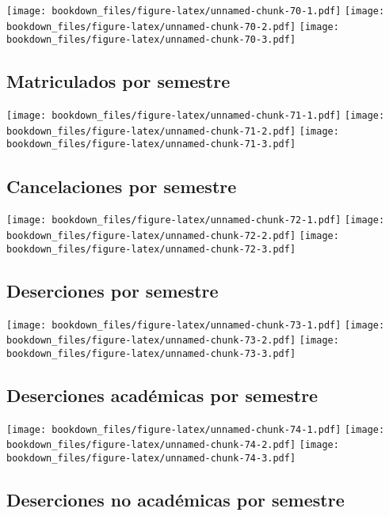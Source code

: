 \documentclass[]{article}
\theoremstyle{definition}
\theoremstyle{definition}
\theoremstyle{definition}
\theoremstyle{remark}
\begin{document}
\texttt{[image: bookdown\_files/figure-latex/unnamed-chunk-70-1.pdf]}
\texttt{[image: bookdown\_files/figure-latex/unnamed-chunk-70-2.pdf]}
\texttt{[image: bookdown\_files/figure-latex/unnamed-chunk-70-3.pdf]}

\subsection{Matriculados por semestre}\label{matriculados-por-semestre}

\texttt{[image: bookdown\_files/figure-latex/unnamed-chunk-71-1.pdf]}
\texttt{[image: bookdown\_files/figure-latex/unnamed-chunk-71-2.pdf]}
\texttt{[image: bookdown\_files/figure-latex/unnamed-chunk-71-3.pdf]}

\subsection{Cancelaciones por
semestre}\label{cancelaciones-por-semestre}

\texttt{[image: bookdown\_files/figure-latex/unnamed-chunk-72-1.pdf]}
\texttt{[image: bookdown\_files/figure-latex/unnamed-chunk-72-2.pdf]}
\texttt{[image: bookdown\_files/figure-latex/unnamed-chunk-72-3.pdf]}

\subsection{Deserciones por semestre}\label{deserciones-por-semestre}

\texttt{[image: bookdown\_files/figure-latex/unnamed-chunk-73-1.pdf]}
\texttt{[image: bookdown\_files/figure-latex/unnamed-chunk-73-2.pdf]}
\texttt{[image: bookdown\_files/figure-latex/unnamed-chunk-73-3.pdf]}

\subsection{Deserciones académicas por
semestre}\label{deserciones-academicas-por-semestre}

\texttt{[image: bookdown\_files/figure-latex/unnamed-chunk-74-1.pdf]}
\texttt{[image: bookdown\_files/figure-latex/unnamed-chunk-74-2.pdf]}
\texttt{[image: bookdown\_files/figure-latex/unnamed-chunk-74-3.pdf]}

\subsection{Deserciones no académicas por
semestre}\label{deserciones-no-academicas-por-semestre}
\end{document}
